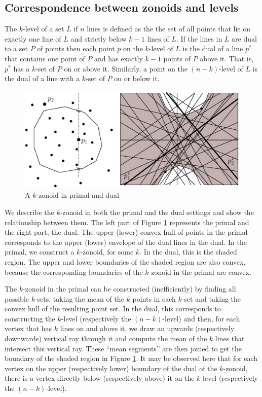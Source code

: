 \documentclass{elsart}
\begin{document}
\subsection{Correspondence between zonoids and levels}\label{subsection_correspondence_between_zonoids_and_klevel}

The $k$-level of a set $L$ if $n$ lines is defined as the the set of
all points that lie on exactly one line of $L$ and strictly below
$k-1$ lines of $L$. If the lines in $L$ are dual to a set $P$ of
points then each  point $p$ on the $k$-level of $L$ is the dual of a
line $p^*$ that contains one point of $P$ and has exactly $k-1$ points
of $P$ above it.  That is, $p^*$ has a $k$-set of $P$ on or above it.
Similarly, a point on the $(n-k)$-level of $L$ is the dual of a line
with a $k$-set of $P$ on or below it.

\begin{figure}
 \begin{center} 
   \includegraphics[height=2in]{fig4}
   \caption{A $k$-zonoid in primal and dual}
   \label{fig_primal_dual}
 \end{center}
\end{figure}

We describe the $k$-zonoid in both the primal and the dual settings
and show the relationship between them. The left part of Figure
\ref{fig_primal_dual} represents the primal and the right part, the
dual. The upper (lower) convex hull of points in the primal
corresponds to the upper (lower) envelope of the dual lines in the
dual. In the primal, we construct a $k$-zonoid, for some $k$. In the
dual, this is the shaded region. The upper and lower boundaries of the
shaded region are also convex, because the corresponding boundaries of
the $k$-zonoid in the primal are convex. 

The $k$-zonoid in the primal can be constructed (inefficiently) by
finding all possible $k$-sets, taking the mean of the $k$ points in each
$k$-set and taking the convex hull of the resulting point set. In the
dual, this corresponds to constructing the $k$-level (respectively the
$(n-k)$-level) and then, for each vertex that has $k$ lines on and
above it, we draw an upwards (respectively downwards) vertical ray
through it and compute the mean of the $k$ lines that intersect this
vertical ray. These ``mean segments'' are then joined to get the
boundary of the shaded region in Figure \ref{fig_primal_dual}. It may
be observed here that for each vertex on the upper (respectively
lower) boundary of the dual of the $k$-zonoid, there is a vertex
directly below (respectively above) it on the $k$-level (respectively
the $(n-k)$-level). 
\end{document}
